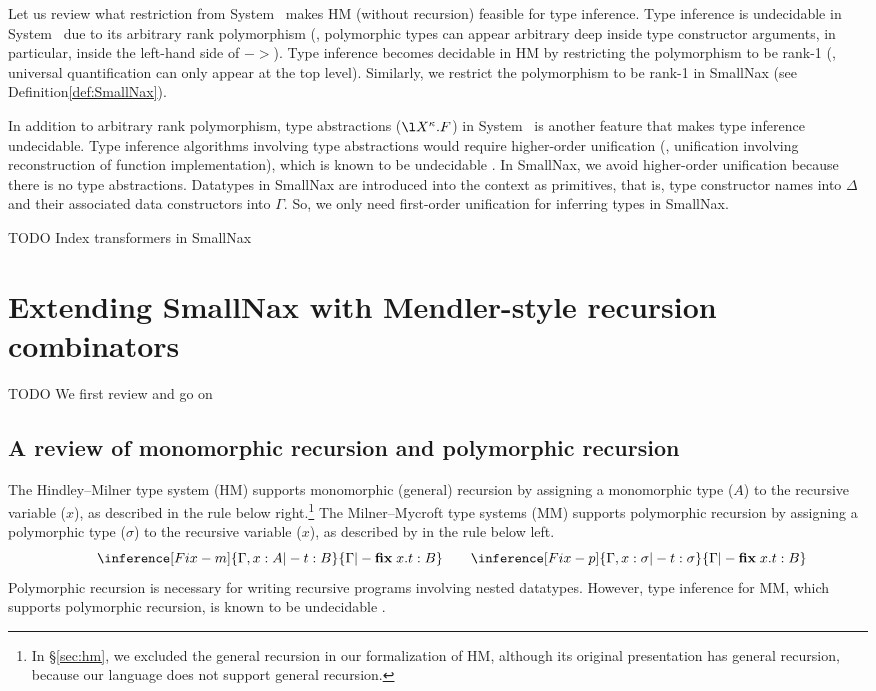 Let us review what restriction from System \F\ makes HM (without recursion)
feasible for type inference. Type inference is undecidable in System \F\ 
due to its arbitrary rank polymorphism (\ie, polymorphic types can appear
arbitrary deep inside type constructor arguments, in particular, inside
the left-hand side of $->$). Type inference becomes decidable in HM
by restricting the polymorphism to be rank-1 (\ie, universal quantification
can only appear at the top level). Similarly, we restrict the polymorphism
to be rank-1 in SmallNax (see Definition\;\ref{def:SmallNax}).

In addition to arbitrary rank polymorphism, type abstractions ($\l X^\kappa.F$)
in System \Fw\ is another feature that makes type inference undecidable.
Type inference algorithms involving type abstractions would require
higher-order unification (\ie, unification involving reconstruction of
function implementation), which is known to be undecidable \cite{Gol81}.
In SmallNax, we avoid higher-order unification because there is no
type abstractions. Datatypes in SmallNax are introduced into the context
as primitives, that is, type constructor names into $\Delta$ and
their associated data constructors into $\Gamma$. So, we only need
first-order unification for inferring types in SmallNax.

TODO Index transformers in SmallNax

\section{Extending SmallNax with Mendler-style recursion combinators}
\label{sec:naxTyInfer:rec}
TODO We first review and go on

\subsection{A review of monomorphic recursion and polymorphic recursion}
The Hindley--Milner type system (HM) \cite{DamMil82} supports
monomorphic (general) recursion by assigning a monomorphic type ($A$)
to the recursive variable ($x$), as described in the rule 
below right.\footnote{
	In \S\ref{sec:hm}, we excluded the general recursion in
	our formalization of HM, although its original presentation
	has general recursion, because our language does not support
	general recursion.}
The Milner--Mycroft type systems (MM) \cite{Myc84} supports
polymorphic recursion by assigning a polymorphic type ($\sigma$)
to the recursive variable ($x$), as described by in the rule 
below left.
\[
\qquad
\inference[\sc Fix-m]{\Gamma,x:A |- t : B}{
	\Gamma |- \textbf{fix}\;x.t : B}
\qquad
\inference[\sc Fix-p]{\Gamma,x:\sigma |- t : \sigma}{
	\Gamma |- \textbf{fix}\;x.t : B}
\]
Polymorphic recursion is necessary for writing recursive programs involving
nested datatypes. However, type inference for MM, which supports polymorphic
recursion, is known to be undecidable \cite{Hen93}.

